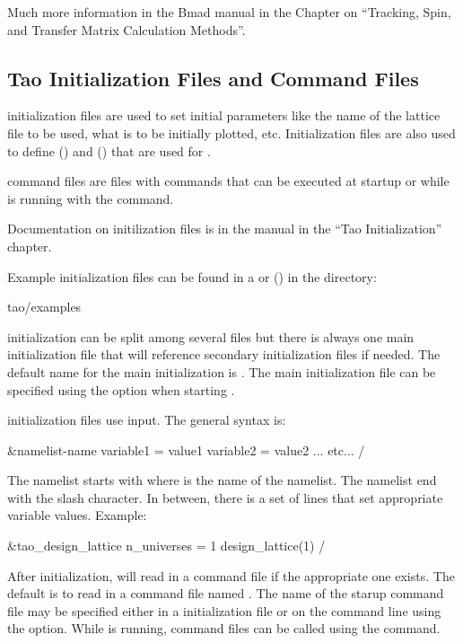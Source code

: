 \documentclass{hitec}
\begin{document}
Much more information in the Bmad manual in the Chapter on ``Tracking, Spin, and Transfer Matrix
Calculation Methods''.

\newpage

\subsection{Tao Initialization Files and Command Files}
\label{s:init.file}

\tao initialization files are used to set initial parameters like the name of the lattice file to be
used, what is to be initially plotted, etc. Initialization files are also used to define 
() and  () that are used for .

\tao command files are files with \tao commands that can be executed at startup or while \tao is running
with the  command. 

Documentation on \tao initilization files is in the \tao manual in the ``Tao Initialization'' chapter.

Example \tao initialization files can be found in a  or 
() in the directory:
\begin{code}
tao/examples
\end{code}

\tao initialization can be split among several files but there is always one main initialization
file that will reference secondary initialization files if needed. The default name for the main
initialization is .  The main initialization file can be specified using the 
option when starting \tao.

\tao initialization files use  input. The general syntax is:
\begin{code}
&namelist-name
  variable1 = value1
  variable2 = value2
  ... etc...
/
\end{code}
The namelist starts with  where  is the name of the
namelist. The namelist end with the slash \vn{/} character. In between, there is a set of lines
that set appropriate variable values. Example:
\begin{code}
&tao_design_lattice
  n_universes = 1
  design_lattice(1)%
/
\end{code}

After initialization, \tao will read in a command file if the appropriate one exists. The default is
to read in a command file named . The name of the starup command file may be
specified either in a initialization file or on the command line using the  option.
While \tao is running, command files can be called using the  command.
\end{document}
